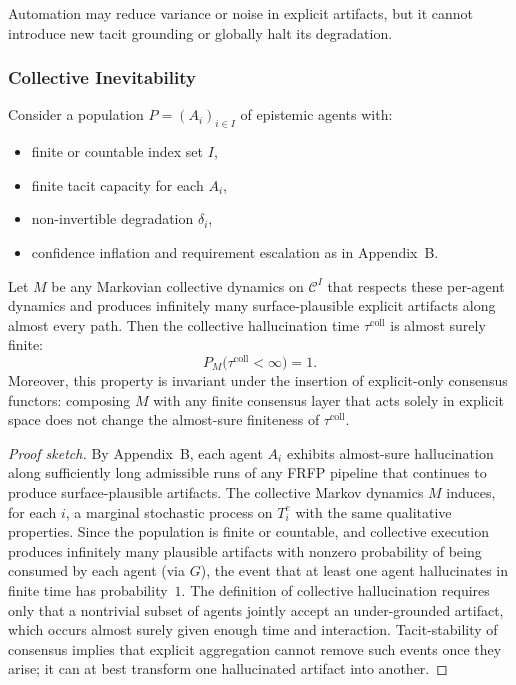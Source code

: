 Automation may reduce variance or noise in explicit artifacts, but it cannot
introduce new tacit grounding or globally halt its degradation.

\subsubsection{Collective Inevitability}

\begin{theorem}
Consider a population $P=(A_i)_{i\in I}$ of epistemic agents with:
\begin{itemize}
  \item finite or countable index set $I$,
  \item finite tacit capacity for each $A_i$,
  \item non-invertible degradation $\delta_i$,
  \item confidence inflation and requirement escalation as in Appendix~B.
\end{itemize}
Let $M$ be any Markovian collective dynamics on $\mathcal{C}^I$ that
respects these per-agent dynamics and produces infinitely many
surface-plausible explicit artifacts along almost every path.
Then the collective hallucination time $\tau^{\mathrm{coll}}$ is almost
surely finite:
\[
  P_M\bigl(\tau^{\mathrm{coll}} < \infty\bigr) = 1.
\]
Moreover, this property is invariant under the insertion of explicit-only
consensus functors: composing $M$ with any finite consensus layer that acts
solely in explicit space does not change the almost-sure finiteness of
$\tau^{\mathrm{coll}}$.
\end{theorem}

\begin{proof}[Proof sketch]
By Appendix~B, each agent $A_i$ exhibits almost-sure hallucination along
sufficiently long admissible runs of any FRFP pipeline that continues to
produce surface-plausible artifacts. The collective Markov dynamics $M$
induces, for each $i$, a marginal stochastic process on $T^e_i$ with the
same qualitative properties. Since the population is finite or countable,
and collective execution produces infinitely many plausible artifacts with
nonzero probability of being consumed by each agent (via $G$), the event
that at least one agent hallucinates in finite time has probability~$1$.
The definition of collective hallucination requires only that a nontrivial
subset of agents jointly accept an under-grounded artifact, which occurs
almost surely given enough time and interaction. Tacit-stability of
consensus implies that explicit aggregation cannot remove such events once
they arise; it can at best transform one hallucinated artifact into another.
\end{proof}

